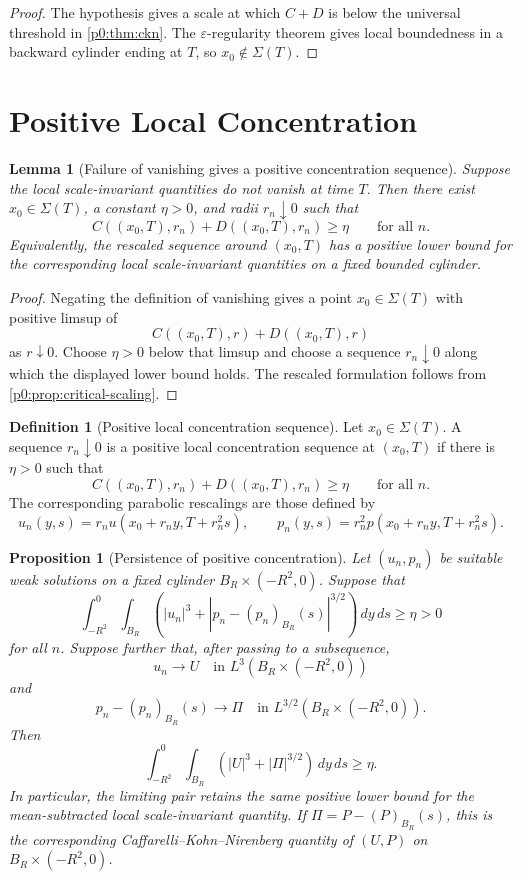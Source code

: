 \documentclass[11pt]{amsart}
\theoremstyle{plain}
\newtheorem{lemma}[lemma]{Lemma}
\newtheorem{proposition}[proposition]{Proposition}
\theoremstyle{definition}
\newtheorem{definition}[definition]{Definition}
\theoremstyle{remark}
\numberwithin{equation}{section}
\begin{document}
\begin{proof}
The hypothesis gives a scale at which \(C+D\) is below the universal threshold
in \cref{p0:thm:ckn}.  The \(\varepsilon\)-regularity theorem gives local boundedness in
a backward cylinder ending at \(T\), so \(x_0\notin\Sigma(T)\).
\end{proof}

\section{Positive Local Concentration}

\begin{lemma}[Failure of vanishing gives a positive concentration sequence]
\label{p0:lem:positive-concentration}
Suppose the local scale-invariant quantities do not vanish at time \(T\).  Then
there exist \(x_0\in\Sigma(T)\), a constant \(\eta>0\), and radii
\(r_n\downarrow0\) such that
\[
  C((x_0,T),r_n)+D((x_0,T),r_n)\ge\eta
  \qquad\text{for all }n.
\]
Equivalently, the rescaled sequence around \((x_0,T)\) has a positive lower
bound for the corresponding local scale-invariant quantities on a fixed
bounded cylinder.
\end{lemma}

\begin{proof}
Negating the definition of vanishing gives a point \(x_0\in\Sigma(T)\) with
positive limsup of
\[
  C((x_0,T),r)+D((x_0,T),r)
\]
as \(r\downarrow0\).  Choose \(\eta>0\) below that limsup and choose a sequence
\(r_n\downarrow0\) along which the displayed lower bound holds.  The rescaled
formulation follows from \cref{p0:prop:critical-scaling}.
\end{proof}

\begin{definition}[Positive local concentration sequence]
\label{p0:def:positive-concentration-sequence}
Let \(x_0\in\Sigma(T)\).  A sequence \(r_n\downarrow0\) is a positive local
concentration sequence at \((x_0,T)\) if there is \(\eta>0\) such that
\[
  C((x_0,T),r_n)+D((x_0,T),r_n)\ge\eta
  \qquad\text{for all }n.
\]
The corresponding parabolic rescalings are those defined by
\[
  u_n(y,s)=r_nu(x_0+r_ny,T+r_n^2s),
  \qquad
  p_n(y,s)=r_n^2p(x_0+r_ny,T+r_n^2s).
\]
\end{definition}

\begin{proposition}[Persistence of positive concentration]
\label{p0:prop:compactness-persistence}
Let \((u_n,p_n)\) be suitable weak solutions on a fixed cylinder
\(B_R\times(-R^2,0)\).  Suppose that
\[
  \int_{-R^2}^{0}\int_{B_R}
  \left(|u_n|^3+|p_n-(p_n)_{B_R}(s)|^{3/2}\right)\,dy\,ds
  \ge\eta>0
\]
for all \(n\).  Suppose further that, after passing to a subsequence,
\[
  u_n\to U\quad\text{in }L^3(B_R\times(-R^2,0))
\]
and
\[
  p_n-(p_n)_{B_R}(s)\to \Pi
  \quad\text{in }L^{3/2}(B_R\times(-R^2,0)).
\]
Then
\[
  \int_{-R^2}^{0}\int_{B_R}
  \left(|U|^3+|\Pi|^{3/2}\right)\,dy\,ds\ge\eta.
\]
In particular, the limiting pair retains the same positive lower bound for the
mean-subtracted local scale-invariant quantity.  If
\(\Pi=P-(P)_{B_R}(s)\), this is the corresponding
Caffarelli--Kohn--Nirenberg quantity of \((U,P)\) on
\(B_R\times(-R^2,0)\).
\end{proposition}
\end{document}
